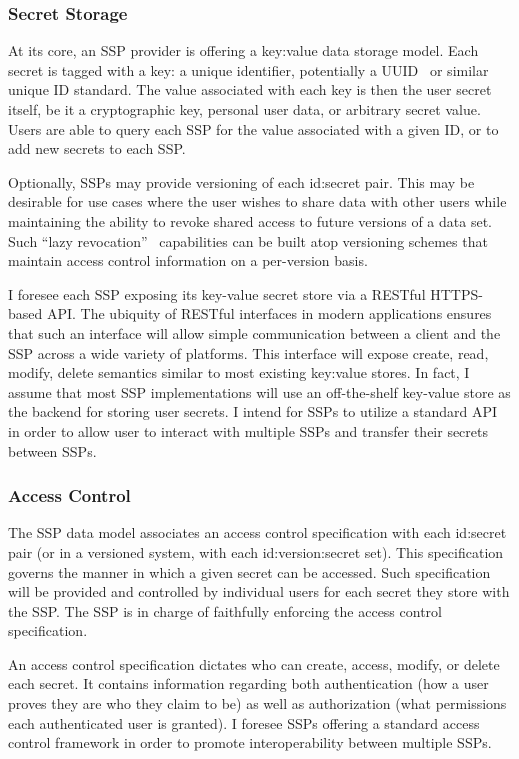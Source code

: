 \subsubsection{Secret Storage}

At its core, an SSP provider is offering a key:value data storage
model. Each secret is tagged with a key: a unique identifier,
potentially a UUID~\cite{leach2005} or similar unique ID standard. The
value associated with each key is then the user secret itself, be it a
cryptographic key, personal user data, or arbitrary secret
value. Users are able to query each SSP for the value associated with
a given ID, or to add new secrets to each SSP.

Optionally, SSPs may provide versioning of each id:secret pair. This
may be desirable for use cases where the user wishes to share data
with other users while maintaining the ability to revoke shared access
to future versions of a data set. Such ``lazy
revocation''~\cite{kallahalla2003} capabilities can be built atop
versioning schemes that maintain access control information on a
per-version basis.

I foresee each SSP exposing its key-value secret store via a RESTful
HTTPS-based API. The ubiquity of RESTful interfaces in modern
applications ensures that such an interface will allow simple
communication between a client and the SSP across a wide variety of
platforms. This interface will expose create, read, modify, delete
semantics similar to most existing key:value stores. In fact, I assume
that most SSP implementations will use an off-the-shelf key-value
store as the backend for storing user secrets. I intend for SSPs to
utilize a standard API in order to allow user to interact with
multiple SSPs and transfer their secrets between SSPs.

\subsubsection{Access Control}

The SSP data model associates an access control specification with
each id:secret pair (or in a versioned system, with each
id:version:secret set). This specification governs the manner in which
a given secret can be accessed. Such specification will be provided
and controlled by individual users for each secret they store with the
SSP. The SSP is in charge of faithfully enforcing the access control
specification.

An access control specification dictates who can create, access,
modify, or delete each secret. It contains information regarding both
authentication (how a user proves they are who they claim to be) as
well as authorization (what permissions each authenticated user is
granted). I foresee SSPs offering a standard access control framework
in order to promote interoperability between multiple SSPs.

